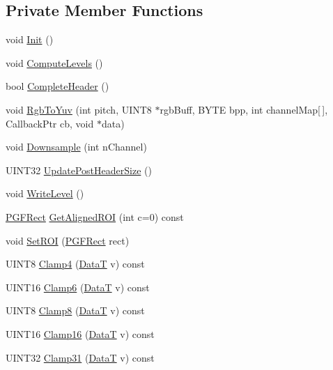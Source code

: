\subsection*{Private Member Functions}
\begin{DoxyCompactItemize}
\item 
void \mbox{\hyperlink{classCPGFImage_ab32b4053e41cc205cce45be8045e603b}{Init}} ()
\item 
void \mbox{\hyperlink{classCPGFImage_ad1ac56e997c83c4c7fe8283b70b84b85}{Compute\+Levels}} ()
\item 
bool \mbox{\hyperlink{classCPGFImage_a0f517491e6b64353cd9ba45f8697b865}{Complete\+Header}} ()
\item 
void \mbox{\hyperlink{classCPGFImage_a7a870dea53390ffe1af210069f6b30eb}{Rgb\+To\+Yuv}} (int pitch, U\+I\+N\+T8 $\ast$rgb\+Buff, B\+Y\+TE bpp, int channel\+Map\mbox{[}$\,$\mbox{]}, Callback\+Ptr cb, void $\ast$data)
\item 
void \mbox{\hyperlink{classCPGFImage_a1db75413dfdc6f752088a53de0e6b998}{Downsample}} (int n\+Channel)
\item 
U\+I\+N\+T32 \mbox{\hyperlink{classCPGFImage_a921e1ec08da8ddf6ab4d5657e5610fee}{Update\+Post\+Header\+Size}} ()
\item 
void \mbox{\hyperlink{classCPGFImage_a1075a31893ee4ea2c686f5b471dd3664}{Write\+Level}} ()
\item 
\mbox{\hyperlink{structPGFRect}{P\+G\+F\+Rect}} \mbox{\hyperlink{classCPGFImage_a1a9c711365d0d6188b89262027e60265}{Get\+Aligned\+R\+OI}} (int c=0) const
\item 
void \mbox{\hyperlink{classCPGFImage_a83c737ee649fdc92c55b7a6ffe1153b2}{Set\+R\+OI}} (\mbox{\hyperlink{structPGFRect}{P\+G\+F\+Rect}} rect)
\item 
U\+I\+N\+T8 \mbox{\hyperlink{classCPGFImage_adc3d79612346af8109230039b1077c46}{Clamp4}} (\mbox{\hyperlink{PGFtypes_8h_acb1ee3f52ccfad782dcaa0abd79e5d05}{DataT}} v) const
\item 
U\+I\+N\+T16 \mbox{\hyperlink{classCPGFImage_a15adcf6db4b6c3f60db26c7809b0bd54}{Clamp6}} (\mbox{\hyperlink{PGFtypes_8h_acb1ee3f52ccfad782dcaa0abd79e5d05}{DataT}} v) const
\item 
U\+I\+N\+T8 \mbox{\hyperlink{classCPGFImage_a7748968cec3128d6dbdeb224814ca14a}{Clamp8}} (\mbox{\hyperlink{PGFtypes_8h_acb1ee3f52ccfad782dcaa0abd79e5d05}{DataT}} v) const
\item 
U\+I\+N\+T16 \mbox{\hyperlink{classCPGFImage_a666cd327643276fdd5e8b123fcbc991f}{Clamp16}} (\mbox{\hyperlink{PGFtypes_8h_acb1ee3f52ccfad782dcaa0abd79e5d05}{DataT}} v) const
\item 
U\+I\+N\+T32 \mbox{\hyperlink{classCPGFImage_a075dc79f2453625086a3f1987d692296}{Clamp31}} (\mbox{\hyperlink{PGFtypes_8h_acb1ee3f52ccfad782dcaa0abd79e5d05}{DataT}} v) const
\end{DoxyCompactItemize}
